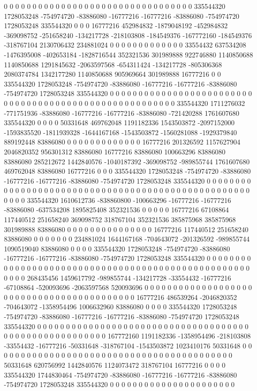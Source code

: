 0 0 0 0 0 0 0 0 0 0 0 0 0 0 0 0 0 0 0 0 0 0 0 0 0 0 0 0 0 0 0 0 0 335544320 1728053248 -754974720 -83886080 -16777216 -16777216 -83886080 -754974720 1728053248 335544320 0 0 0 16777216 452984832 -1879048192 -452984832 -369098752 -251658240 -134217728 -218103808 -184549376 -167772160 -184549376 -318767104 2130706432 234881024 0 0 0 0 0 0 0 0 0 0 0 0 0 33554432 637534208 -1476395008 -402653184 -1828716544 352321536 301989888 922746880 1140850688 1140850688 1291845632 -2063597568 -654311424 -134217728 -805306368 2080374784 1342177280 1140850688 905969664 301989888 16777216 0 0 335544320 1728053248 -754974720 -83886080 -16777216 -16777216 -83886080 -754974720 1728053248 335544320 0 0 0 0 0 0 0 0 0 0 0 0 0 0 0 0 0 0 0 0 0 0
0 0 0 0 0 0 0 0 0 0 0 0 0 0 0 0 0 0 0 0 0 0 0 0 0 0 0 0 0 0 0 0 0 335544320 1711276032 -771751936 -83886080 -16777216 -16777216 -83886080 -721420288 1761607680 335544320 0 0 0 0 50331648 469762048 1191182336 1543503872 -2097152000 -1593835520 -1811939328 -1644167168 -1543503872 -1560281088 -1929379840 889192448 83886080 0 0 0 0 0 0 0 0 0 0 0 0 0 16777216 201326592 1157627904 2046820352 956301312 83886080 16777216 83886080 100663296 83886080 83886080 285212672 1442840576 -1040187392 -369098752 -989855744 1761607680 469762048 83886080 16777216 0 0 0 335544320 1728053248 -754974720 -83886080 -16777216 -16777216 -83886080 -754974720 1728053248 335544320 0 0 0 0 0 0 0 0 0 0 0 0 0 0 0 0 0 0 0 0 0 0
0 0 0 0 0 0 0 0 0 0 0 0 0 0 0 0 0 0 0 0 0 0 0 0 0 0 0 0 0 0 0 0 0 335544320 1610612736 -838860800 -100663296 -16777216 -16777216 -83886080 -637534208 1895825408 352321536 0 0 0 0 0 16777216 67108864 117440512 251658240 369098752 318767104 352321536 385875968 385875968 301989888 83886080 0 0 0 0 0 0 0 0 0 0 0 0 0 0 0 16777216 117440512 251658240 83886080 0 0 0 0 0 0 0 234881024 1644167168 -704643072 -201326592 -989855744 1090519040 83886080 0 0 0 0 335544320 1728053248 -754974720 -83886080 -16777216 -16777216 -83886080 -754974720 1728053248 335544320 0 0 0 0 0 0 0 0 0 0 0 0 0 0 0 0 0 0 0 0 0 0
0 0 0 0 0 0 0 0 0 0 0 0 0 0 0 0 0 0 0 0 0 0 0 0 0 0 0 0 0 0 0 0 0 268435456 1459617792 -989855744 -134217728 -33554432 -16777216 -67108864 -520093696 -2063597568 520093696 0 0 0 0 0 0 0 0 0 0 0 0 0 0 0 0 0 0 0 0 0 0 0 0 0 0 0 0 0 0 0 0 0 0 0 0 0 0 0 0 0 0 16777216 486539264 -2046820352 -704643072 -1358954496 1006632960 83886080 0 0 0 0 335544320 1728053248 -754974720 -83886080 -16777216 -16777216 -83886080 -754974720 1728053248 335544320 0 0 0 0 0 0 0 0 0 0 0 0 0 0 0 0 0 0 0 0 0 0
0 0 0 0 0 0 0 0 0 0 0 0 0 0 0 0 0 0 0 0 0 0 0 0 0 0 0 0 0 0 0 0 0 167772160 1191182336 -1358954496 -218103808 -33554432 -16777216 -50331648 -318767104 -1543503872 1023410176 50331648 0 0 0 0 0 0 0 0 0 0 0 0 0 0 0 0 0 0 0 0 0 0 0 0 0 0 0 0 0 0 0 0 0 0 0 0 0 0 0 0 0 0 50331648 620756992 1442840576 1124073472 318767104 16777216 0 0 0 0 335544320 1744830464 -754974720 -83886080 -16777216 -16777216 -83886080 -754974720 1728053248 335544320 0 0 0 0 0 0 0 0 0 0 0 0 0 0 0 0 0 0 0 0 0 0
